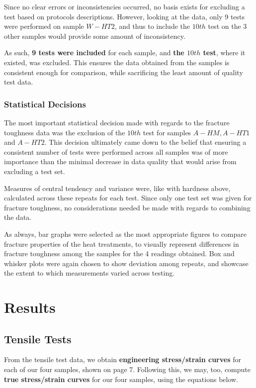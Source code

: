 \documentclass{article}
\begin{document}
Since no clear errors or inconsistencies occurred, no basis exists for excluding a test based on protocols descriptions. However, looking at the data, only 9 tests were performed on sample $W-HT2$, and thus to include the $10th$ test on the 3 other samples would provide some amount of inconsistency. 

As such, \textbf{9 tests were included} for each sample, and \textbf{the $10th$ test}, where it existed, was excluded. This ensures the data obtained from the samples is consistent enough for comparison, while sacrificing the least amount of quality test data. 

\subsubsection{Statistical Decisions}
The most important statistical decision made with regards to the fracture toughness data was the exclusion of the $10th$ test for samples $A-HM, A-HT1$ and $A-HT2$. This decision ultimately came down to the belief that ensuring a consistent number of tests were performed across all samples was of more importance than the minimal decrease in data quality that would arise from excluding a test set. 

Measures of central tendency and variance were, like with hardness above, calculated across these repeats for each test. Since only one test set was given for fracture toughness, no considerations needed be made with regards to combining the data.

As always, bar graphs were selected as the most appropriate figures to compare fracture properties of the heat treatments, to visually represent differences in fracture toughness among the samples for the 4 readings obtained. Box and whisker plots were again chosen to show deviation among repeats, and showcase the extent to which measurements varied across testing.

\section{Results}

\subsection{Tensile Tests}
From the tensile test data, we obtain \textbf{engineering stress/strain curves} for each of our four samples, shown on page 7. Following this, we may, too, compute \textbf{true stress/strain curves} for our four samples, using the equations below.
\end{document}
